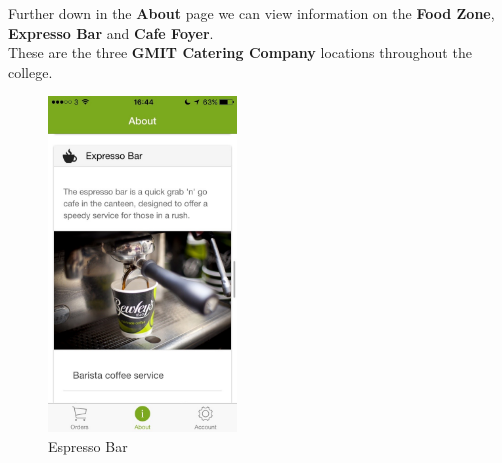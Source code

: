 \begin{minipage}{0.55\textwidth}
Further down in the \textbf{About} page we can view information on the \textbf{Food Zone}, \textbf{Expresso Bar} and \textbf{Cafe Foyer}. 
\\

These are the three \textbf{GMIT Catering Company} locations throughout the college.
\end{minipage}
\begin{minipage}{5cm}
	\begin{figure}[H]
		\includegraphics[width=5cm]{img/mobile-app/screen-shots/IMG_2912.jpg}
		\caption{Espresso Bar}
	\end{figure}
\end{minipage} \hfill

